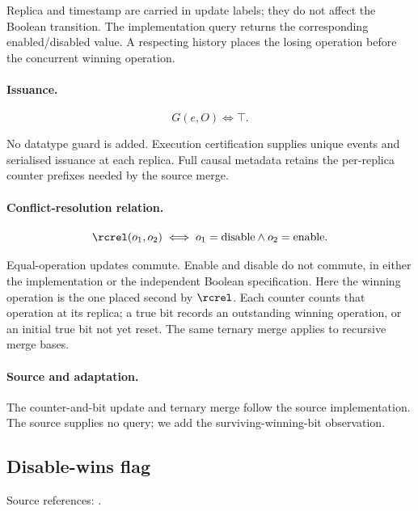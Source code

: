 Replica and timestamp are carried in update labels; they do not affect the Boolean transition. The implementation query returns the corresponding enabled/disabled value. A respecting history places the losing operation before the concurrent winning operation.


\paragraph{Issuance.}
\[
G(e,O)\iff\top.
\]

No datatype guard is added. Execution certification supplies unique events and serialised issuance at each replica. Full causal metadata retains the per-replica counter prefixes needed by the source merge.


\paragraph{Conflict-resolution relation.}
\[
\rcrel(o_1,o_2)\iff o_1=\mathrm{disable}\land o_2=\mathrm{enable}.
\]

Equal-operation updates commute. Enable and disable do not commute, in either the implementation or the independent Boolean specification. Here the winning operation is the one placed second by $\rcrel$. Each counter counts that operation at its replica; a true bit records an outstanding winning operation, or an initial true bit not yet reset. The same ternary merge applies to recursive merge bases.


\paragraph{Source and adaptation.}
The counter-and-bit update and ternary merge follow the source implementation. The source supplies no query; we add the surviving-winning-bit observation.


\subsection{Disable-wins flag}
\label{app:dt-disable-wins-flag}

\noindent Source references: \cite{neem}.



